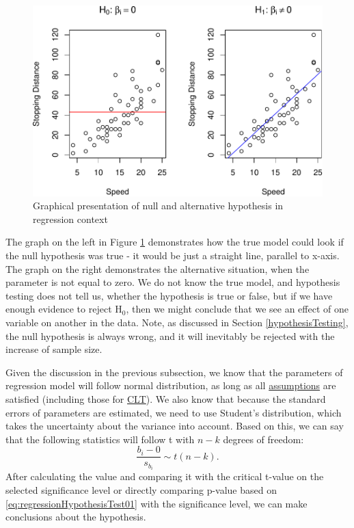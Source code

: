 \documentclass[
]{book}
\theoremstyle{definition}
\theoremstyle{definition}
\theoremstyle{definition}
\theoremstyle{definition}
\theoremstyle{remark}
\begin{document}
\begin{figure}
\centering
\includegraphics{Svetunkov---Statistics-for-Business-Analytics_files/figure-latex/speedDistanceHypotheses-1.pdf}
\caption{\label{fig:speedDistanceHypotheses}Graphical presentation of null and alternative hypothesis in regression context}
\end{figure}

The graph on the left in Figure \ref{fig:speedDistanceHypotheses} demonstrates how the true model could look if the null hypothesis was true - it would be just a straight line, parallel to x-axis. The graph on the right demonstrates the alternative situation, when the parameter is not equal to zero. We do not know the true model, and hypothesis testing does not tell us, whether the hypothesis is true or false, but if we have enough evidence to reject H\(_0\), then we might conclude that we see an effect of one variable on another in the data. Note, as discussed in Section \ref{hypothesisTesting}, the null hypothesis is always wrong, and it will inevitably be rejected with the increase of sample size.

Given the discussion in the previous subsection, we know that the parameters of regression model will follow normal distribution, as long as all \protect\hyperlink{assumptions}{assumptions} are satisfied (including those for \protect\hyperlink{CLT}{CLT}). We also know that because the standard errors of parameters are estimated, we need to use Student's distribution, which takes the uncertainty about the variance into account. Based on this, we can say that the following statistics will follow t with \(n-k\) degrees of freedom:
\begin{equation}
    \frac{b_i - 0}{s_{b_i}} \sim t(n-k) .
    \label{eq:regressionHypothesisTest01}
\end{equation}
After calculating the value and comparing it with the critical t-value on the selected significance level or directly comparing p-value based on \eqref{eq:regressionHypothesisTest01} with the significance level, we can make conclusions about the hypothesis.
\end{document}
